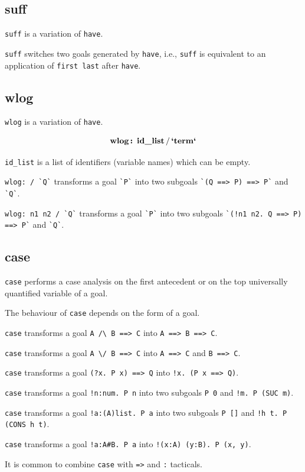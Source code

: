 \documentclass[a4paper]{article}
\newcommand{\xx}[1]{\mathop{\text{\bf #1}}}
\begin{document}
\subsection{suff}
\verb|suff| is a variation of \verb|have|.

\verb|suff| switches two goals generated by \verb|have|, i.e., \verb|suff| is equivalent to an application of \verb|first last| after \verb|have|.


\subsection{wlog}
\verb|wlog| is a variation of \verb|have|.

$$\xx{wlog}\xx{:}\ \xx{id\_list}/\xx{`term`}$$

\verb|id_list| is a list of identifiers (variable names) which can be empty.

\verb|wlog: / `Q`| transforms a goal \verb|`P`| into two subgoals \verb|`(Q ==> P) ==> P`| and \verb|`Q`|.

\verb|wlog: n1 n2 / `Q`| transforms a goal \verb|`P`| into two subgoals \verb|`(!n1 n2. Q ==> P) ==> P`| and \verb|`Q`|.



\subsection{case}
\verb|case| performs a case analysis on the first antecedent or on the top universally quantified variable of a goal.

The behaviour of \verb|case| depends on the form of a goal.

\verb|case| transforms a goal \verb|A /\ B ==> C| into \verb|A ==> B ==> C|.

\verb|case| transforms a goal \verb|A \/ B ==> C| into \verb|A ==> C| and \verb|B ==> C|.

\verb|case| transforms a goal \verb|(?x. P x) ==> Q| into \verb|!x. (P x ==> Q)|.

\verb|case| transforms a goal \verb|!n:num. P n| into two subgoals \verb|P 0| and \verb|!m. P (SUC m)|.

\verb|case| transforms a goal \verb|!a:(A)list. P a| into two subgoals \verb|P []| and \verb|!h t. P (CONS h t)|.

\verb|case| transforms a goal \verb|!a:A#B. P a| into \verb|!(x:A) (y:B). P (x, y)|.

It is common to combine \verb|case| with \verb|=>| and \verb|:| tacticals.
\end{document}
